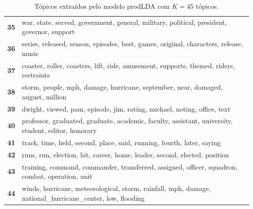 \begin{table}[htpb]
\begin{tabularx}{\textwidth}{@{}l X@{}}
        \textbf{35} & war, state, served, government, general, military, political, president, governor, support \\
        \textbf{36} & series, released, season, episodes, best, games, original, characters, release, music \\
        \textbf{37} & coaster, roller, coasters, lift, ride, amusement, supports, themed, riders, restraints \\
        \textbf{38} & storm, people, mph, damage, hurricane, september, near, damaged, august, million \\
        \textbf{39} & dwight, viewed, pam, episode, jim, rating, michael, noting, office, text \\
        \textbf{40} & professor, graduated, graduate, academic, faculty, assistant, university, student, editor, honorary \\
        \textbf{41} & track, time, held, second, place, said, running, fourth, later, saying \\
        \textbf{42} & runs, run, election, hit, career, home, leader, second, elected, position \\
        \textbf{43} & training, command, commander, transferred, assigned, officer, squadron, combat, operation, unit \\
        \textbf{44} & winds, hurricane, meteorological, storm, rainfall, mph, damage, national\_hurricane\_center, low, flooding \\
        \bottomrule
    \end{tabularx}
    \caption{Tópicos extraídos pelo modelo prodLDA com $K=45$ tópicos.}
    \label{tab:topicos_prodlda_45}
\end{table}
